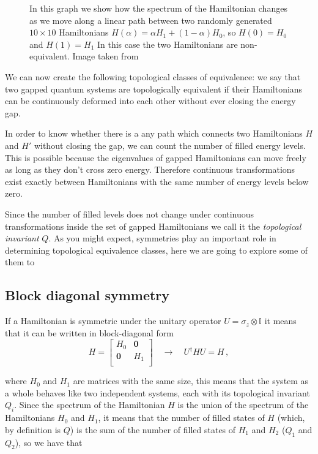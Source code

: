    \begin{figure}[h]
        \centering
        
        \caption{
        In this graph we show how the spectrum of the Hamiltonian changes as we move along a linear path between two randomly generated $10\times 10$ Hamiltonians $H(\alpha)=\alpha H_1+ (1-\alpha)H_0$, so $H(0)=H_0$ and $H(1)=H_1$
        In this case the two Hamiltonians are non-equivalent. Image taken from \cite{topocondmat}}
        \label{fig:ham-path-1}
    \end{figure}    
    
    We can now create the following topological classes of equivalence: we say that two gapped quantum systems are topologically equivalent if their Hamiltonians can be continuously deformed into each other without ever closing the energy gap.
    
    In order to know whether there is a any path which connects two Hamiltonians $H$ and $H'$ without closing the gap, we can count the number of filled energy levels. This is possible because the eigenvalues of gapped Hamiltonians can move freely as long as they don’t cross zero energy. Therefore continuous transformations exist exactly between Hamiltonians with the same number of energy levels below zero.
    
    Since the number of filled levels does not change under continuous transformations inside the set of gapped Hamiltonians we call it the \textit{topological invariant} $Q$. As you might expect, symmetries play an important role in determining topological equivalence classes, here we are going to explore some of them to 


\subsection*{Block diagonal symmetry}
If a Hamiltonian is symmetric under the unitary operator $U=\sigma_z\otimes \mathbb I$ it means that it can be written in block-diagonal form
\begin{equation}
    H=
    \begin{bmatrix}
    H_0 & \boldsymbol 0\\
    \boldsymbol 0 & H_1\\
    \end{bmatrix}
    \quad
    \rightarrow
    \quad U^\dag H U=H\,,
\end{equation}

where $H_0$ and $H_1$ are matrices with the same size, this means that the system as a whole behaves like two independent systems, each with its topological invariant $Q_i$.
Since the spectrum of the Hamiltonian $H$ is the union of the spectrum of the Hamiltonians $H_0$ and $H_1$, it means that the number of filled states of $H$ (which, by definition is $Q$) is the sum of the number of filled states of $H_1$ and $H_2$ ($Q_1$ and $Q_2$), so we have that 

